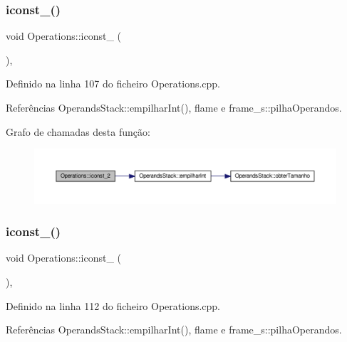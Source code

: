 \subsubsection{\texorpdfstring{iconst\+\_()}{iconst\_2()}}
{\footnotesize\ttfamily void Operations\+::iconst\+\_ (\begin{DoxyParamCaption}{ }\end{DoxyParamCaption})\hspace{0.3cm}{\ttfamily [static]}, {\ttfamily [private]}}



Definido na linha 107 do ficheiro Operations.\+cpp.



Referências Operands\+Stack\+::empilhar\+Int(), flame e frame\+\_\+s\+::pilha\+Operandos.

Grafo de chamadas desta função\+:
\nopagebreak
\begin{figure}[H]
\begin{center}
\leavevmode
\includegraphics[width=350pt]{classOperations_af1a4f99f0d99da0a7db7fc926932a3c8_cgraph}
\end{center}
\end{figure}
\mbox{\label{classOperations_ab8466864c000152e75172b623704f610}} 
\subsubsection{\texorpdfstring{iconst\+\_()}{iconst\_3()}}
{\footnotesize\ttfamily void Operations\+::iconst\+\_ (\begin{DoxyParamCaption}{ }\end{DoxyParamCaption})\hspace{0.3cm}{\ttfamily [static]}, {\ttfamily [private]}}



Definido na linha 112 do ficheiro Operations.\+cpp.



Referências Operands\+Stack\+::empilhar\+Int(), flame e frame\+\_\+s\+::pilha\+Operandos.

